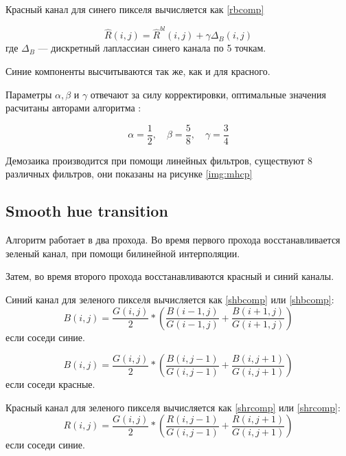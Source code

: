 Красный канал для синего пикселя вычисляется как \ref{rbcomp}

\begin{equation}
	\label{rbcomp}
	\hat{R}(i,j) = \hat{R}^{bl}(i,j) + \gamma\Delta_{B}(i,j) 
\end{equation}
где $\Delta_{B}$ --- дискретный лаплассиан синего канала по 5 точкам.

Синие компоненты высчитываются так же, как и для красного.

Параметры $\alpha, \beta$ и $\gamma$ отвечают за силу корректировки, оптимальные значения расчитаны авторами алгоритма \cite{mhcd}:

\begin{equation}
	\alpha = \frac{1}{2}, \quad \beta = \frac{5}{8}, \quad \gamma = \frac{3}{4}
\end{equation}

Демозаика производится при помощи линейных фильтров, существуют 8 различных фильтров, они показаны на рисунке \ref{img:mhcp}


\subsection{Smooth hue transition}

Алгоритм работает в два прохода. Во время первого прохода восстанавливается зеленый канал, при помощи билинейной интерполяции. \cite{sht}

Затем, во время второго прохода восстанавливаются красный и синий каналы.

Синий канал для зеленого пикселя вычисляется как \ref{shbcomp} или \ref{shbcomp}:
\begin{equation}
	\label{shbcomp}
	{B}(i,j) = \frac{{G}(i,j)}{2} * (\frac{{B}(i - 1,j)}{{G}(i-1,j)} + \frac{{B}(i+1,j)}{{G}(i+1,j)})
\end{equation}
если соседи синие.

\begin{equation}
	\label{shbcomp2}
	{B}(i,j) = \frac{{G}(i,j)}{2} * (\frac{{B}(i,j-1)}{{G}(i,j-1)} + \frac{{B}(i,j+1)}{{G}(i,j+1)})
\end{equation}
если соседи красные.

Красный канал для зеленого пикселя вычисляется как \ref{shrcomp} или \ref{shrcomp}:
\begin{equation}
	\label{shrcomp2}
	{R}(i,j) = \frac{{G}(i,j)}{2} * (\frac{{R}(i,j-1)}{{G}(i,j-1)} + \frac{{R}(i,j+1)}{{G}(i,j+1)})
\end{equation}
если соседи синие.

